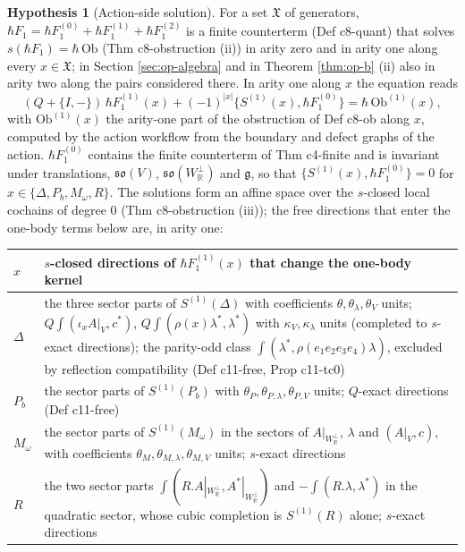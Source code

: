 \documentclass[11pt]{article}
\numberwithin{equation}{section}
\theoremstyle{plain}
\theoremstyle{definition}
\newtheorem{hypothesis}[theorem]{Hypothesis}
\newcommand{\Ap}{A|_{W_{\mathbb R}^\perp}}
\newcommand{\AV}{A|_V}
\begin{document}
\begin{hypothesis}[Action-side solution]
\label{hyp:op-A}
For a set $\mathfrak X$ of generators, $\hbar F_1=\hbar F_1^{(0)}+\hbar F_1^{(1)}+\hbar F_1^{(2)}$ is a finite counterterm (Def c8-quant) that solves $s(\hbar F_1)=\hbar\,\mathrm{Ob}$ (Thm c8-obstruction (ii)) in arity zero and in arity one along every $x\in\mathfrak X$; in Section \ref{sec:op-algebra} and in Theorem \ref{thm:op-b} (ii) also in arity two along the pairs considered there. In arity one along $x$ the equation reads
\begin{equation}
(Q+\{I,-\})\,\hbar F_1^{(1)}(x)+(-1)^{|x|}\big\{S^{(1)}(x),\hbar F_1^{(0)}\big\}=\hbar\,\mathrm{Ob}^{(1)}(x),
\label{eq:op-arity1}
\end{equation}
with $\mathrm{Ob}^{(1)}(x)$ the arity-one part of the obstruction of Def c8-ob along $x$, computed by the action workflow from the boundary and defect graphs of the action. $\hbar F_1^{(0)}$ contains the finite counterterm of Thm c4-finite and is invariant under translations, $\mathfrak{so}(V)$, $\mathfrak{so}(W_{\mathbb R}^\perp)$ and $\mathfrak g$, so that $\{S^{(1)}(x),\hbar F_1^{(0)}\}=0$ for $x\in\{\Delta,P_b,M_\omega,R\}$. The solutions form an affine space over the $s$-closed local cochains of degree $0$ (Thm c8-obstruction (iii)); the free directions that enter the one-body terms below are, in arity one:
\begin{center}
\begin{tabular}{l|p{11.2cm}}
$x$ & $s$-closed directions of $\hbar F_1^{(1)}(x)$ that change the one-body kernel\\
\hline
$\Delta$ & the three sector parts of $S^{(1)}(\Delta)$ with coefficients $\theta,\theta_\lambda,\theta_V$ units; $Q\int(\iota_xA|_V,c^*)$, $Q\int(\rho(x)\lambda^*,\lambda^*)$ with $\kappa_V,\kappa_\lambda$ units (completed to $s$-exact directions); the parity-odd class $\int(\lambda^*,\rho(e_1e_2e_3e_4)\lambda)$, excluded by reflection compatibility (Def c11-free, Prop c11-tc0)\\
$P_b$ & the sector parts of $S^{(1)}(P_b)$ with $\theta_P,\theta_{P,\lambda},\theta_{P,V}$ units; $Q$-exact directions (Def c11-free)\\
$M_\omega$ & the sector parts of $S^{(1)}(M_\omega)$ in the sectors of $\Ap$, $\lambda$ and $(\AV,c)$, with coefficients $\theta_{M},\theta_{M,\lambda},\theta_{M,V}$ units; $s$-exact directions\\
$R$ & the two sector parts $\int(R.\Ap,A^*|_{W_{\mathbb R}^\perp})$ and $-\int(R.\lambda,\lambda^*)$ in the quadratic sector, whose cubic completion is $S^{(1)}(R)$ alone; $s$-exact directions\\

\end{tabular}
\end{center}
\end{hypothesis}
\end{document}
